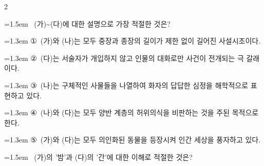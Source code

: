 \documentclass[10pt, a4paper]{article}
\begin{document}
\begin{multicols}{2}
\noindent\begin{minipage}{\columnwidth}
\vspace{2mm}
{\hangindent=1.5em  ~(가)\textasciitilde{}(다)에 대한 설명으로 가장 적절한 것은?\par}

\vspace{0.5mm}
{\hangindent=1.3em  \noindent\hspace{0.3em}①~(가)와 (나)는 모두 중장과 종장의 길이가 제한 없이 길어진 사설시조이다.\par}
{\hangindent=1.3em  \noindent\hspace{0.3em}②~(다)는 서술자가 개입하지 않고 인물의 대화로만 사건이 전개되는 극 갈래이다.\par}
{\hangindent=1.3em  \noindent\hspace{0.3em}③~(나)는 구체적인 사물들을 나열하여 화자의 답답한 심정을 해학적으로 표현하고 있다.\par}
{\hangindent=1.3em  \noindent\hspace{0.3em}④~(나)와 (다)는 모두 양반 계층의 허위의식을 비판하는 것을 주된 목적으로 한다.\par}
{\hangindent=1.3em  \noindent\hspace{0.3em}⑤~(가)와 (다)는 모두 의인화된 동물을 등장시켜 인간 세상을 풍자하고 있다.\par}
\vspace{4mm}
\end{minipage}
\par

\noindent\begin{minipage}{\columnwidth}
\vspace{2mm}
{\hangindent=1.5em  ~(가)의 '밤'과 (다)의 '간'에 대한 이해로 적절한 것은?\par}


\end{minipage}
\end{multicols}
\end{document}
